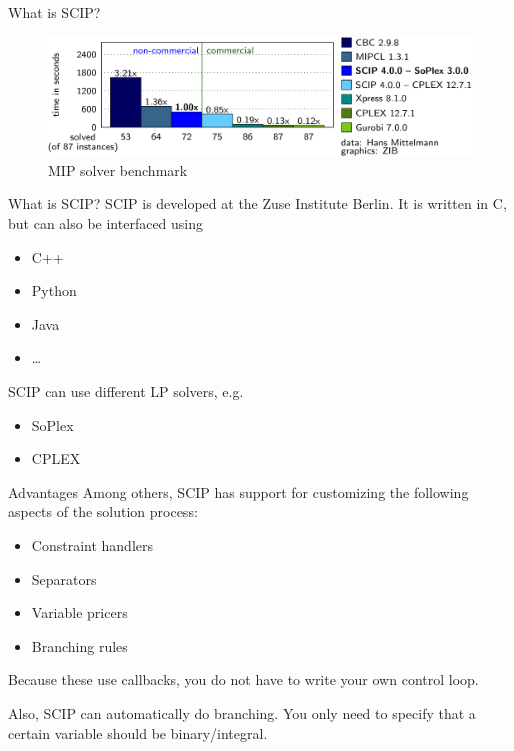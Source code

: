 \documentclass[fleqn]{beamer}
\begin{document}
    \begin{frame}{What is SCIP?}
        \begin{figure}
            \includegraphics{comparison}
            \caption{MIP solver benchmark}
        \end{figure}
    \end{frame}

    \begin{frame}{What is SCIP?}
        SCIP is developed at the Zuse Institute Berlin.
        It is written in C, but can also be interfaced using
        \begin{itemize}
            \item C++
            \item Python
            \item Java
            \item \dots
        \end{itemize}
    
        SCIP can use different LP solvers, e.g.
        \begin{itemize}
            \item SoPlex %
            \item CPLEX
        \end{itemize}
    \end{frame}

    \begin{frame}{Advantages}
        Among others, SCIP has support for customizing the following aspects of the solution process:
        \begin{itemize}
            \item Constraint handlers %
            \item Separators
            \item Variable pricers
            \item Branching rules
        \end{itemize}
        Because these use callbacks, you do not have to write your own control loop.
        
        Also, SCIP can automatically do branching.
        You only need to specify that a certain variable should be binary/integral.
    \end{frame}
	
\end{document}

